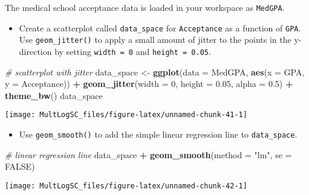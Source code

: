 \documentclass[]{book}
\newenvironment{Shaded}{\begin{snugshade}}{\end{snugshade}}
\newcommand{\KeywordTok}[1]{\textcolor[rgb]{0.13,0.29,0.53}{\textbf{#1}}}
\newcommand{\DataTypeTok}[1]{\textcolor[rgb]{0.13,0.29,0.53}{#1}}
\newcommand{\DecValTok}[1]{\textcolor[rgb]{0.00,0.00,0.81}{#1}}
\newcommand{\FloatTok}[1]{\textcolor[rgb]{0.00,0.00,0.81}{#1}}
\newcommand{\StringTok}[1]{\textcolor[rgb]{0.31,0.60,0.02}{#1}}
\newcommand{\CommentTok}[1]{\textcolor[rgb]{0.56,0.35,0.01}{\textit{#1}}}
\newcommand{\OtherTok}[1]{\textcolor[rgb]{0.56,0.35,0.01}{#1}}
\newcommand{\OperatorTok}[1]{\textcolor[rgb]{0.81,0.36,0.00}{\textbf{#1}}}
\newcommand{\NormalTok}[1]{#1}
\providecommand{\tightlist}{%
  \setlength{\itemsep}{0pt}\setlength{\parskip}{0pt}}
\begin{document}
The medical school acceptance data is loaded in your workspace as
\texttt{MedGPA}.

\begin{itemize}
\tightlist
\item
  Create a scatterplot called \texttt{data\_space} for
  \texttt{Acceptance} as a function of \texttt{GPA}. Use
  \texttt{geom\_jitter()} to apply a small amount of jitter to the
  points in the y-direction by setting \texttt{width\ =\ 0} and
  \texttt{height\ =\ 0.05}.
\end{itemize}

\begin{Shaded}
\begin{Highlighting}[]
\CommentTok{# scatterplot with jitter}
\NormalTok{data_space <-}\StringTok{ }\KeywordTok{ggplot}\NormalTok{(}\DataTypeTok{data =}\NormalTok{ MedGPA, }\KeywordTok{aes}\NormalTok{(}\DataTypeTok{x =}\NormalTok{ GPA, }\DataTypeTok{y =}\NormalTok{ Acceptance)) }\OperatorTok{+}
\StringTok{  }\KeywordTok{geom_jitter}\NormalTok{(}\DataTypeTok{width =} \DecValTok{0}\NormalTok{, }\DataTypeTok{height =} \FloatTok{0.05}\NormalTok{, }\DataTypeTok{alpha =} \FloatTok{0.5}\NormalTok{) }\OperatorTok{+}\StringTok{ }
\StringTok{  }\KeywordTok{theme_bw}\NormalTok{()}
\NormalTok{data_space}
\end{Highlighting}
\end{Shaded}

\begin{center}\texttt{[image: MultLogSC\_files/figure-latex/unnamed-chunk-41-1]} \end{center}

\begin{itemize}
\tightlist
\item
  Use \texttt{geom\_smooth()} to add the simple linear regression line
  to \texttt{data\_space}.
\end{itemize}

\begin{Shaded}
\begin{Highlighting}[]
\CommentTok{# linear regression line}
\NormalTok{data_space }\OperatorTok{+}\StringTok{ }
\StringTok{  }\KeywordTok{geom_smooth}\NormalTok{(}\DataTypeTok{method =} \StringTok{"lm"}\NormalTok{, }\DataTypeTok{se =} \OtherTok{FALSE}\NormalTok{)}
\end{Highlighting}
\end{Shaded}

\begin{center}\texttt{[image: MultLogSC\_files/figure-latex/unnamed-chunk-42-1]} \end{center}
\end{document}
